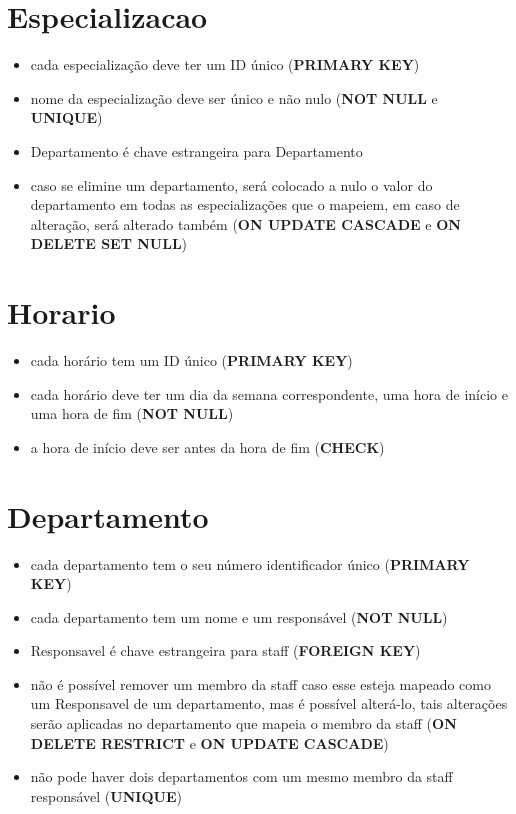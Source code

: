 \documentclass[article, a4paper, 12pt, oneside]{memoir}
\begin{document}
\section*{Especializacao}
\begin{itemize}
	\item cada especialização deve ter um ID único (\textbf{PRIMARY KEY})
	\item nome da especialização deve ser único e não nulo (\textbf{NOT NULL} e \textbf{UNIQUE})
	\item Departamento é chave estrangeira para Departamento
	\item caso se elimine um departamento, será colocado a nulo o valor do departamento em todas as especializações que o mapeiem, em caso de alteração, será alterado também (\textbf{ON UPDATE CASCADE} e \textbf{ON DELETE SET NULL})
\end{itemize}

\newpage

\section*{Horario}
\begin{itemize}
	\item cada horário tem um ID único (\textbf{PRIMARY KEY})
	\item cada horário deve ter um dia da semana correspondente, uma hora de início e uma hora de fim (\textbf{NOT NULL})
	\item a hora de início deve ser antes da hora de fim (\textbf{CHECK})
\end{itemize}

\section*{Departamento}
\begin{itemize}
	\item cada departamento tem o seu número identificador único (\textbf{PRIMARY KEY})
	\item cada departamento tem um nome e um responsável (\textbf{NOT NULL})
	\item Responsavel é chave estrangeira para staff (\textbf{FOREIGN KEY})
	\item não é possível remover um membro da staff caso esse esteja mapeado como um Responsavel de um departamento, mas é possível alterá-lo, tais alterações serão aplicadas no departamento que mapeia o membro da staff (\textbf{ON DELETE RESTRICT} e \textbf{ON UPDATE CASCADE})
	\item não pode haver dois departamentos com um mesmo membro da staff responsável (\textbf{UNIQUE})
\end{itemize}
\end{document}
